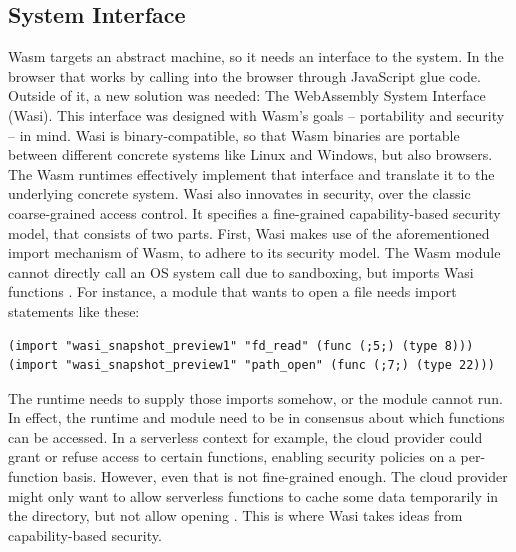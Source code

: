 
\subsection{System Interface}

Wasm targets an abstract machine, so it needs an interface to the system. In the browser that works by calling into the browser through JavaScript glue code. Outside of it, a new solution was needed: The WebAssembly System Interface (Wasi). This interface was designed with Wasm's goals -- portability and security -- in mind.
Wasi is binary-compatible, so that Wasm binaries are portable between different concrete systems like Linux and Windows, but also browsers. The Wasm runtimes effectively implement that interface and translate it to the underlying concrete system.
Wasi also innovates in security, over the classic coarse-grained access control. It specifies a fine-grained capability-based security model, that consists of two parts. First, Wasi makes use of the aforementioned import mechanism of Wasm, to adhere to its security model. The Wasm module cannot directly call an OS system call due to sandboxing, but imports Wasi functions \cite{Clark2019}. For instance, a module that wants to open a file needs import statements like these:

\begin{verbatim}
(import "wasi_snapshot_preview1" "fd_read" (func (;5;) (type 8)))
(import "wasi_snapshot_preview1" "path_open" (func (;7;) (type 22)))
\end{verbatim}

The runtime needs to supply those imports somehow, or the module cannot run. In effect, the runtime and module need to be in consensus about which functions can be accessed. In a serverless context for example, the cloud provider could grant or refuse access to certain functions, enabling security policies on a per-function basis. However, even that is not fine-grained enough. The cloud provider might only want to allow serverless functions to cache some data temporarily in the  directory, but not allow opening . This is where Wasi takes ideas from capability-based security.

